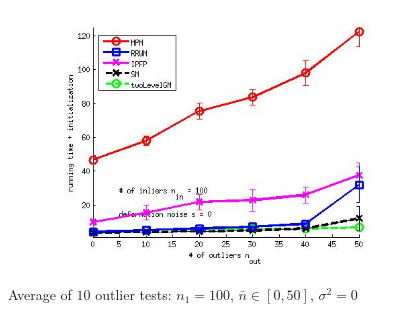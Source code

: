 \documentclass[
	fontsize=12pt,
	paper=a4,
	twoside=false,
	numbers=noenddot,
	plainheadsepline,
	toc=listof,
	toc=bibliography
]{scrartcl}
\begin{document}
\begin{figure}[h]
\begin{subfigure}[b]{0.3\textwidth}
		\includegraphics[scale=0.25]{"fig_ver2608/syntheticPointSets/ver4.3.2/outliertest_nodeform_n50/time_summary_avg10t"} 
	\end{subfigure} 	
	\caption{Average of $10$ outlier tests: $n_1=100$, $\bar{n}\in[0,50]$, $\sigma^2=0$}
	\label{fig:test2_ver432}
\end{figure}
\FloatBarrier	
\end{document}
